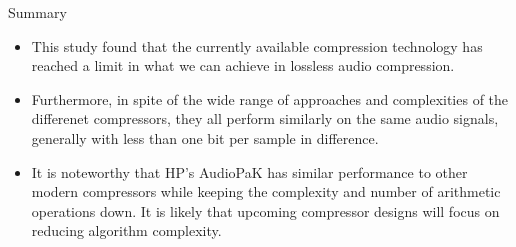 \documentclass{beamer}
\begin{document}
\begin{frame}{Summary}
  \begin{itemize}[<+->]
  \item
    This study found that the \alert{currently available compression technology} has \alert{reached a limit} in what we can achieve in \alert{lossless audio compression}.
  \item
    Furthermore, in spite of the \alert{wide range of approaches and complexities} of the differenet compressors, they all \alert{perform similarly} on the same audio signals, generally with less than one bit per sample in difference.
  \item
    It is noteworthy that HP's AudioPaK has similar performance to other modern compressors while keeping the complexity and number of arithmetic operations down. It is likely that upcoming compressor designs will focus on reducing algorithm complexity.
  \end{itemize}
  
\end{frame}
\end{document}
